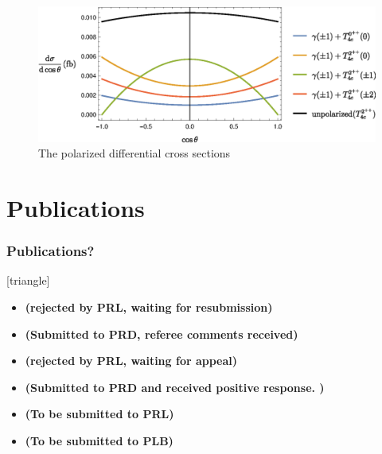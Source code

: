 \begin{frame}
\begin{minipage}{0.6\textwidth}
\begin{figure}[!hbtp]
	      \centering
	      \includegraphics[width=\textwidth]{DifferentialCrossSection.eps}
	      \caption{The polarized differential cross sections}
	      \label{fig:pcs}
	    \end{figure}
  \end{minipage}

\end{frame}

\section*{Publications}
\begin{frame}
  \frametitle{Publications?}


  {\small
    [triangle]
    \begin{itemize}
      \item{} {\bf (rejected by PRL, waiting for resubmission)}

      \item{} {\bf (Submitted to PRD, referee comments received)}

      \item{} {\bf (rejected by PRL, waiting for appeal)}

      \item{} {\bf (Submitted to PRD and received positive response. )}

      \item{} {\bf (To be submitted to PRL)}

      \item{} {\bf (To be submitted to PLB)}
    \end{itemize}
  }

\end{frame}

